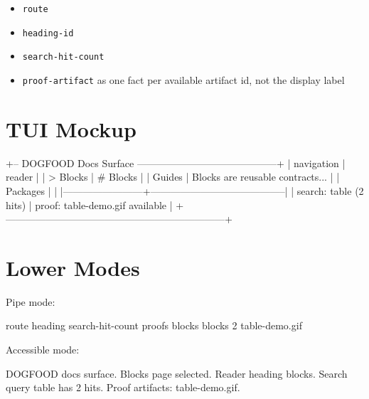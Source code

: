 \begin{itemize}
\tightlist
\item
  \texttt{r\allowbreak{}o\allowbreak{}u\allowbreak{}t\allowbreak{}e}
\item
  \texttt{h\allowbreak{}e\allowbreak{}a\allowbreak{}d\allowbreak{}i\allowbreak{}n\allowbreak{}g\allowbreak{}-\allowbreak{}i\allowbreak{}d}
\item
  \texttt{s\allowbreak{}e\allowbreak{}a\allowbreak{}r\allowbreak{}c\allowbreak{}h\allowbreak{}-\allowbreak{}h\allowbreak{}i\allowbreak{}t\allowbreak{}-\allowbreak{}c\allowbreak{}o\allowbreak{}u\allowbreak{}n\allowbreak{}t}
\item
  \texttt{p\allowbreak{}r\allowbreak{}o\allowbreak{}o\allowbreak{}f\allowbreak{}-\allowbreak{}a\allowbreak{}r\allowbreak{}t\allowbreak{}i\allowbreak{}f\allowbreak{}a\allowbreak{}c\allowbreak{}t} as one fact per available artifact id, not the display label
\end{itemize}

\section{TUI Mockup}\label{record-091-tui-mockup}

\begin{CodeBlock}
+-- DOGFOOD Docs Surface ------------------------------------------+
| navigation             | reader                                  |
| > Blocks               | # Blocks                                |
|   Guides               | Blocks are reusable contracts...       |
|   Packages             |                                         |
|------------------------+-----------------------------------------|
| search: table (2 hits) | proof: table-demo.gif available        |
+------------------------------------------------------------------+
\end{CodeBlock}

\section{Lower Modes}\label{record-091-lower-modes}

Pipe mode:

\begin{CodeBlock}
route   heading search-hit-count    proofs
blocks  blocks  2   table-demo.gif
\end{CodeBlock}

Accessible mode:

\begin{CodeBlock}
DOGFOOD docs surface. Blocks page selected. Reader heading blocks.
Search query table has 2 hits. Proof artifacts: table-demo.gif.
\end{CodeBlock}

